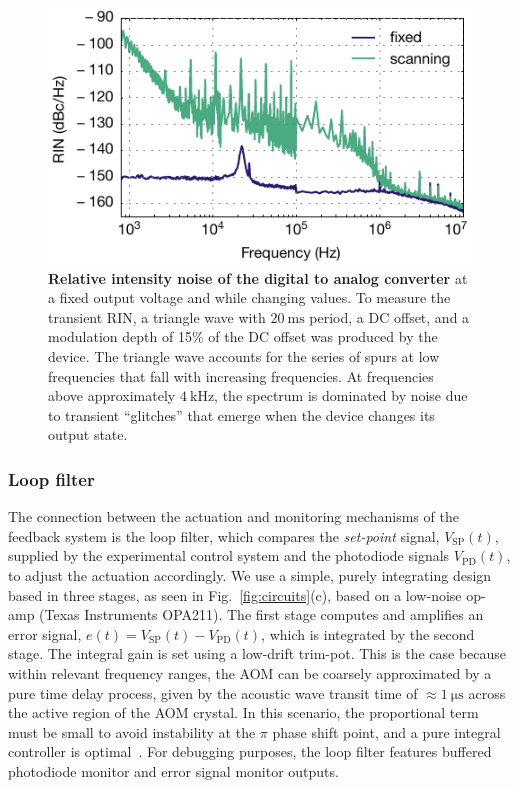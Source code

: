 \documentclass[twocolumn,aps,pra,showpacs,preprintnumbers,bibnotes]{revtex4-1}
\newcommand\unit[2]{\ensuremath{#1~\mathrm{{#2}}}}
\begin{document}
\begin{figure}
  \begin{center}
    \includegraphics{Figure9.pdf}
    \caption{\textbf{Relative intensity noise of the digital to analog converter} at a fixed output voltage and while changing values. To measure the transient RIN, a triangle wave with \unit{20}{ms} period, a DC offset, and a modulation depth of 15\% of the DC offset was produced by the device. The triangle wave accounts for the series of spurs at low frequencies that fall with increasing frequencies. At frequencies above approximately \unit{4}{kHz}, the spectrum is dominated by noise due to transient ``glitches'' that emerge when the device changes its output state.}\label{fig:da_rin}
  \end{center}
\end{figure}


\subsubsection{Loop filter}

The connection between the actuation and monitoring mechanisms of the feedback system is the loop filter, which compares the \emph{set-point} signal, $V_\mathrm{SP}(t)$, supplied by the experimental control system and the photodiode signals $V_\mathrm{PD}(t)$, to adjust the actuation accordingly.
We use a simple, purely integrating design based in three stages, as seen in Fig.~\ref{fig:circuits}(c), based on a low-noise op-amp (Texas Instruments OPA211).
The first stage computes and amplifies an error signal, $e(t)=V_\mathrm{SP}(t)-V_\mathrm{PD}(t)$, which is integrated by the second stage.
The integral gain is set using a low-drift trim-pot.
This is the case because within relevant frequency ranges, the AOM can be coarsely approximated by a pure time delay process, given by the acoustic wave transit time of $\approx$\unit{1}{\mu{}s} across the active region of the AOM crystal.
In this scenario, the proportional term must be small to avoid instability at the $\pi$ phase shift point, and a pure integral controller is optimal~\cite{Skogestad2003}.
For debugging purposes, the loop filter features buffered photodiode monitor and error signal monitor outputs.
\end{document}
